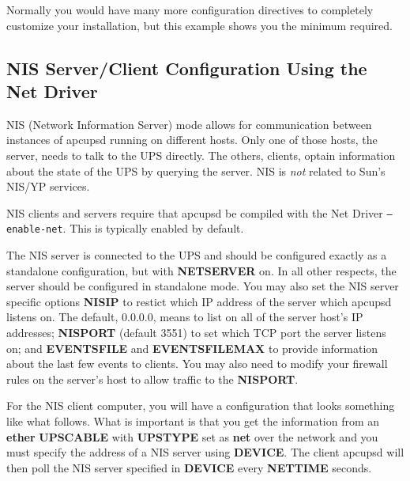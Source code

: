 Normally you would have many more configuration directives to completely
customize your installation, but this example shows you the minimum required. 

\label{A-Sample-NIS-Slave-Configuration-Using-the-Net-Driver}

\subsection*{NIS Server/Client Configuration Using the Net Driver}

\label{index-Example_002c-NIS-slave-81}
\label{index-NIS-slave-conf-82}
\label{index-Configuration_002c-NIS-slave-conf-83}

NIS (Network Information Server) mode allows for communication between
instances of apcupsd running on different hosts.  Only one of those
hosts, the server, needs to talk to the UPS directly.  The others,
clients, optain information about the state of the UPS by querying the
server.  NIS is \emph{not} related to Sun's NIS/YP services.

NIS clients and servers require that apcupsd be compiled with the Net
Driver \texttt{{---}enable-net}.  This is typically enabled by default.

The NIS server is connected to the UPS and should be configured exactly
as a standalone configuration, but with \textbf{NETSERVER} on.  In all
other respects, the server should be configured in standalone mode.  You
may also set the NIS server specific options \textbf{NISIP} to
restict which IP address of the server which apcupsd listens on.  The
default, 0.0.0.0, means to list on all of the server host's IP addresses;
\textbf{NISPORT} (default 3551) to set which TCP port the server listens on;
and \textbf{EVENTSFILE} and \textbf{EVENTSFILEMAX} to provide information
about the last few events to clients.  You may also need to modify your
firewall rules on the server's host to allow traffic to the
\textbf{NISPORT}\@.

For the NIS client computer, you will have a configuration that looks something
like what follows.  What is important is that you get the information from an
\textbf{ether} \textbf{UPSCABLE} with \textbf{UPSTYPE} set as
\textbf{net} over the network and you must specify the address of a NIS
server using \textbf{DEVICE}\@. The client apcupsd will then poll the
NIS server specified in \textbf{DEVICE} every \textbf{NETTIME} seconds.

